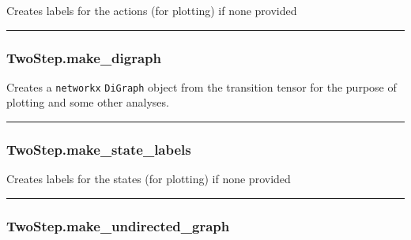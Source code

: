 Creates labels for the actions (for plotting) if none provided

\begin{center}\rule{0.5\linewidth}{\linethickness}\end{center}

\subsubsection{TwoStep.make\_digraph}\label{twostep.make_digraph}

\begin{Shaded}
\begin{Highlighting}[]
\NormalTok{)}
\end{Highlighting}
\end{Shaded}

Creates a \texttt{networkx} \texttt{DiGraph} object from the transition
tensor for the purpose of plotting and some other analyses.

\begin{center}\rule{0.5\linewidth}{\linethickness}\end{center}

\subsubsection{TwoStep.make\_state\_labels}\label{twostep.make_state_labels}

\begin{Shaded}
\begin{Highlighting}[]
\NormalTok{)}
\end{Highlighting}
\end{Shaded}

Creates labels for the states (for plotting) if none provided

\begin{center}\rule{0.5\linewidth}{\linethickness}\end{center}

\subsubsection{TwoStep.make\_undirected\_graph}\label{twostep.make_undirected_graph}

\begin{Shaded}
\begin{Highlighting}[]
\NormalTok{)}
\end{Highlighting}
\end{Shaded}

